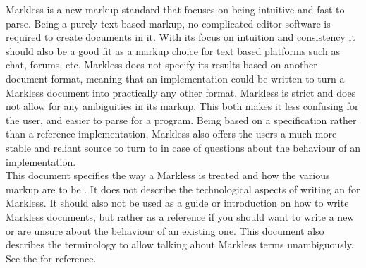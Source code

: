 Markless is a new markup standard that focuses on being intuitive and fast to parse. Being a purely text-based markup, no complicated editor software is required to create documents in it. With its focus on intuition and consistency it should also be a good fit as a markup choice for text based platforms such as chat, forums, etc. Markless does not specify its results based on another document format, meaning that an implementation could be written to turn a Markless document into practically any other format. Markless is strict and does not allow for any ambiguities in its markup. This both makes it less confusing for the user, and easier to parse for a program. Being based on a specification rather than a reference implementation, Markless also offers the users a much more stable and reliant source to turn to in case of questions about the behaviour of an implementation.\\

This document specifies the way a Markless  is treated and how the various markup  are to be . It does not describe the technological aspects of writing an  for Markless. It should also not be used as a guide or introduction on how to write Markless documents, but rather as a reference if you should want to write a new  or are unsure about the behaviour of an existing one. This document also describes the terminology to allow talking about Markless terms unambiguously. See the  for reference.

